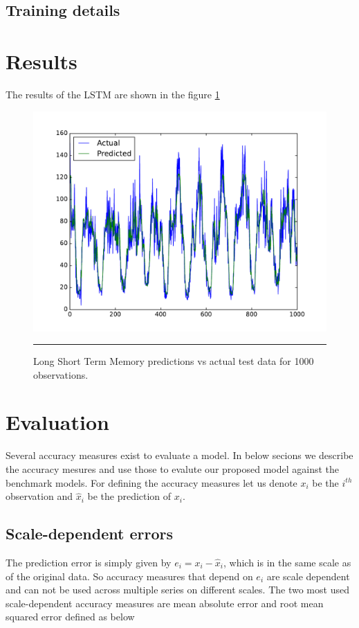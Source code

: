 \subsection{Training details}


\section{Results}

The results of the LSTM are shown in the figure \ref{fig:LstmActualPredicted}

\begin{figure}[htbp]
  \centering
    \includegraphics[width=\textwidth,height=\textheight,keepaspectratio]{Figures/lstm.pdf}
    \rule{35em}{0.5pt}
  \caption[LSTM - Actual vs Predictions]{Long Short Term Memory predictions vs actual test data for
  1000 observations.}
  \label{fig:LstmActualPredicted}
\end{figure}

\section{Evaluation}

Several accuracy measures exist to evaluate a model. In below secions we describe the accuracy
mesures and use those to evalute our proposed model against the benchmark models. For defining
the accuracy measures let us denote $x_{i}$ be the $i^{th}$ observation and $\hat{x}_{i}$ be the
prediction of $x_{i}$.

\subsection{Scale-dependent errors}
The prediction error is simply given by $e_{i} = x_{i} - \hat{x}_{i}$, which is in the same scale
as of the original data. So accuracy measures that depend on $e_{i}$ are scale dependent and can
not be used across multiple series on different scales. The two most used scale-dependent
accuracy measures are mean absolute error and root mean squared error defined as below

